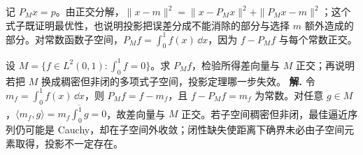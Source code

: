 记 \(P_Mx=p\)。由正交分解，\(\|x-m\|^2=\|x-P_Mx\|^2+\|P_Mx-m\|^2\)；这个式子既证明最优性，也说明投影把误差分成不能消除的部分与选择 \(m\) 额外造成的部分。对常数函数子空间，\(P_Mf=\int_0^1f(x)\,\dd x\)，因为 \(f-P_Mf\) 与每个常数正交。





\par
\begin{workedexample}
设 \(M=\{f\in L^2(0,1):\int_0^1f=0\}\)。求 \(P_Mf\)，检验所得差向量与 \(M\) 正交；再说明若把 \(M\) 换成稠密但非闭的多项式子空间，投影定理哪一步失效。
\textbf{解.} 令 \(m_f=\int_0^1f(x)\,\dd x\)，则 \(P_Mf=f-m_f\)，且 \(f-P_Mf=m_f\) 为常数。对任意 \(g\in M\)，\(\langle m_f,g\rangle=m_f\overline{\int_0^1g}=0\)，故差向量与 \(M\) 正交。若子空间稠密但非闭，最佳逼近序列仍可能是 Cauchy，却在子空间外收敛；闭性缺失使距离下确界未必由子空间元素取得，投影不一定存在。
\end{workedexample}
\par
